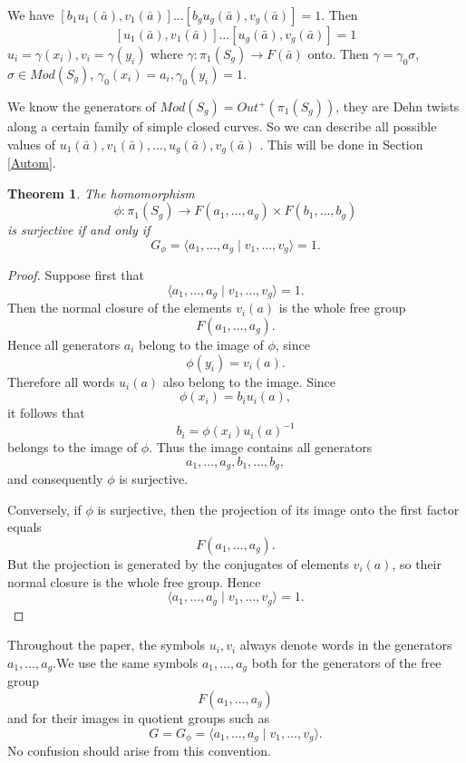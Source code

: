 \documentclass{article}
\newtheorem{theorem}{Theorem}[section]
\begin{document}
We have 
 $[b_1u_1(\bar a),v_1(\bar a)]\ldots [b_gu_g(\bar a),v_g(\bar a)]=1.$ 
 Then
\begin{equation}\label{1} [u_1(\bar a),v_1(\bar a)]\ldots [u_g(\bar a),v_g(\bar a)]=1 \end{equation}
$u_i=\gamma (x_i), v_i=\gamma (y_i)$
where $\gamma: \pi _1(S_g)\rightarrow F(\bar a)$ onto. Then $\gamma=\gamma_0\sigma $, $\sigma \in Mod(S_g)$,
 $\gamma _0(x_i)=a_i,   \gamma _0(y_i)=1.$
 
 We know the generators of $Mod(S_g)=Out ^{+}(\pi _1(S_g))$, they are Dehn twists along a certain family of simple closed curves. So we can describe all possible values of 
$u_1(\bar a),v_1(\bar a),\ldots ,u_g(\bar a),v_g(\bar a)$ . This will be done in Section \ref{Autom}.
\begin{theorem}
The homomorphism
\[
\phi:\pi_1(S_g)\to F(a_1,\dots,a_g)\times F(b_1,\dots,b_g)
\]
is surjective if and only if
\[
G_{\phi}=\langle a_1,\dots,a_g\mid v_1,\dots,v_g\rangle =1.
\]
\end{theorem}

\begin{proof}
Suppose first that
\[
\langle a_1,\dots,a_g\mid v_1,\dots,v_g\rangle =1.
\]
Then the normal closure of the elements \(v_i(a)\) is the whole free group
\[
F(a_1,\dots,a_g).
\]
Hence all generators \(a_i\) belong to the image of \(\phi\), since
\[
\phi(y_i)=v_i(a).
\]
Therefore all words \(u_i(a)\) also belong to the image. Since
\[
\phi(x_i)=b_i u_i(a),
\]
it follows that
\[
b_i=\phi(x_i)u_i(a)^{-1}
\]
belongs to the image of \(\phi\). Thus the image contains all generators
\[
a_1,\dots,a_g,b_1,\dots,b_g,
\]
and consequently \(\phi\) is surjective.

Conversely, if \(\phi\) is surjective, then the projection of its image onto the first factor equals
\[
F(a_1,\dots,a_g).
\]
But the projection is generated by the conjugates of elements \(v_i(a)\), so their normal closure is the whole free group. Hence
\[
\langle a_1,\dots,a_g\mid v_1,\dots,v_g\rangle =1.
\]
\end{proof}

Throughout the paper,
the symbols \(u_i,v_i\) always denote words in the generators
\(a_1,\dots,a_g\).We use the same symbols \(a_1,\dots,a_g\) both for the generators of the free
group
\[
F(a_1,\dots,a_g)
\]
and for their images in quotient groups such as
\[
G=G_{\phi}=\langle a_1,\dots,a_g\mid v_1,\dots,v_g\rangle.
\]
No confusion should arise from this convention.
\end{document}
